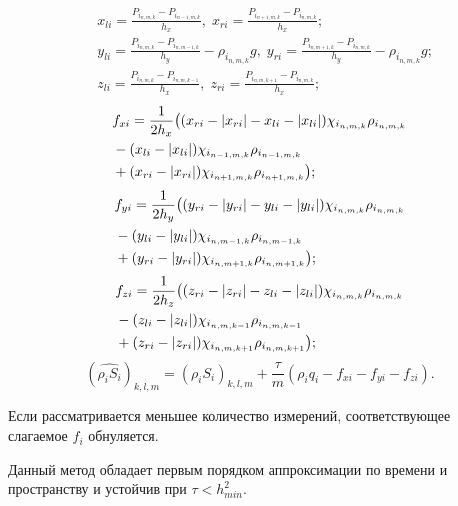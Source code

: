 \begin{equation*}
  \begin{aligned}
    &x_{li}= \frac{P_{i_{n,m,k}}-P_{i_{n-1,m,k}}}{h_x} , \;
    x_{ri}=  \frac{P_{i_{n+1,m,k}}-P_{i_{n,m,k}}}{h_x} ;\\
    &y_{li}= \frac{P_{i_{n,m,k}}-P_{i_{n,m-1,k}}}{h_y} - \rho_{i_{n,m,k}} g,\;
    y_{ri}=  \frac{P_{i_{n,m+1,k}}-P_{i_{n,m,k}}}{h_y} - \rho_{i_{n,m,k}} g;\\
    &z_{li}= \frac{P_{i_{n,m,k}}-P_{i_{n,m,k-1}}}{h_x} , \;
    z_{ri}=  \frac{P_{i_{n,m,k+1}}-P_{i_{n,m,k}}}{h_x} ;
  \end{aligned}
\end{equation*}
\begin{eqnarray*}
    &f_{xi} = \frac{1}{2h_x} \big{(} (x_{ri} - |x_{ri}| - x_{li} - |x_{li}|) \chi_{i_{n,m,k}} \rho_{i_{n,m,k}} \\
    &- (x_{li} - |x_{li}|) \chi_{i_{n-1,m,k}} \rho_{i_{n-1,m,k}} \\
    &+ (x_{ri} - |x_{ri}|) \chi_{i_{n+1,m,k}} \rho_{i_{n+1,m,k}} \big{)};
\end{eqnarray*}
\begin{eqnarray*}
    &f_{yi} = \frac{1}{2h_y} \big{(} (y_{ri} - |y_{ri}| - y_{li} - |y_{li}|) \chi_{i_{n,m,k}} \rho_{i_{n,m,k}} \\
    &- (y_{li} - |y_{li}|) \chi_{i_{n,m-1,k}} \rho_{i_{n,m-1,k}} \\
    &+ (y_{ri} - |y_{ri}|) \chi_{i_{n,m+1,k}} \rho_{i_{n,m+1,k}} \big{)};
\end{eqnarray*}
\begin{eqnarray*}
    &f_{zi} = \frac{1}{2h_z} \big{(} (z_{ri} - |z_{ri}| - z_{li} - |z_{li}|) \chi_{i_{n,m,k}} \rho_{i_{n,m,k}} \\
    &- (z_{li} - |z_{li}|) \chi_{i_{n,m,k-1}} \rho_{i_{n,m,k-1}} \\
    &+ (z_{ri} - |z_{ri}|) \chi_{i_{n,m,k+1}} \rho_{i_{n,m,k+1}} \big{)};
\end{eqnarray*}
\begin{equation*}
    (\widehat{\rho_i S_i})_{k,l,m}=(\rho_i S_i)_{k,l,m}+\frac{\tau}{m}(\rho_i q_i - f_{xi} - f_{yi} - f_{zi}).
\end{equation*}

Если рассматривается меньшее количество измерений,
соответствующее слагаемое $f_i$ обнуляется.

Данный метод обладает первым порядком аппроксимации по времени
и пространству и устойчив при $\tau < h_{min}^2$.

